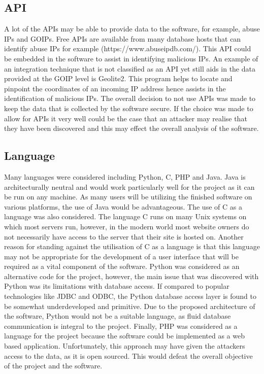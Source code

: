 \subsection*{API }
A lot of the APIs may be able to provide data to the software, for example, abuse IPs and GOIPs. Free APIs are available from many database hosts that can identify abuse IPs for example (https://www.abuseipdb.com/). This API could be embedded in the software to assist in identifying malicious IPs. An example of an integration technique that is not classified as an API yet still aids in the data provided at the GOIP level is Geolite2. This program helps to locate and pinpoint the coordinates of an incoming IP address hence assists in the identification of malicious IPs. The overall decision to not use APIs was made to keep the data that is collected by the software secure. If the choice was made to allow for APIs it very well could be the case that an attacker may realise that they have been discovered and this may effect the overall analysis of the software.

\subsection*{Language} \label{Language}
Many languages were considered including Python, C, PHP and Java. Java is architecturally neutral and would work particularly well for the project as it can be run on any machine. As many users will be utilizing the finished software on various platforms, the use of Java would be advantageous. The use of C as a language was also considered. The language C runs on many Unix systems on which most servers run, however, in the modern world most website owners do not necessarily have access to the server that their site is hosted on. Another reason for standing against the utilisation of C as a language is that this language may not be appropriate for the development of a user interface that will be required as a vital component of the software. Python was considered as an alternative code for the project, however, the main issue that was discovered with Python was its limitations with database access. If compared to popular technologies like JDBC and ODBC, the Python database access layer is found to be somewhat underdeveloped and primitive. Due to the proposed architecture of the software, Python would not be a suitable language, as fluid database communication is integral to the project. Finally, PHP was considered as a language for the project because the software could be implemented as a web based application. Unfortunately, this approach may have given the attackers access to the data, as it is open sourced. This would defeat the overall objective of the project and the software.  

